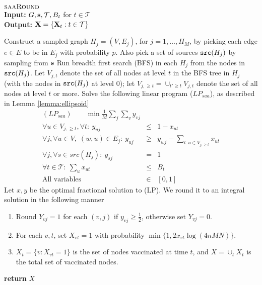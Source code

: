 \begin{algorithm}{}
\small
\caption{\small $\textsc{saaRound}{}$\\
\textbf{Input:} $G, \mathbf{s}, \mathcal{T}, B_t$ for $t\in\mathcal{T}$\\
\textbf{Output:} $\mathbf{X}=\{\mathbf{X}_t: t\in\mathcal{T}\}$
}
\label{alg:saaround}
\begin{algorithmic}[1]
\STATE
Construct a sampled graph $H_j=(V, E_j)$, for $j=1,\ldots,H_M$, by picking each edge $e\in E$ to be in $E_j$
with probability $p$. Also pick a set of sources $\texttt{src}(H_j)$ by sampling from $\mathbf{s}$
\STATE
Run breadth first search (BFS) in each $H_j$ from the nodes in $\texttt{src}(H_j)$.
Let $V_{j,t}$ denote the set of all nodes at level $t$ in the BFS tree in $H_j$ 
(with the nodes in $\texttt{src}(H_j)$ at level $0$); let $V_{j,\geq t}=\cup_{t'\geq t} V_{j,t}$ denote
the set of all nodes at level $t$ or more.
\STATE
Solve the following linear program ($LP_{saa}$), as described in Lemma \ref{lemma:ellipsoid}
\begin{eqnarray}
\label{eqn:obj}
(LP_{saa}) \qquad  \min \frac{1}{M}\sum_j \sum_v y_{vj} && \\
\label{eqn:xy}
\forall u \in V_{j, \geq t}, \forall t:\ y_{uj} &\leq& 1 - x_{ut} \\
\label{eqn1}
\forall j, \forall u\in V, \; (w, u)\in E_j:\ y_{uj} &\geq& y_{wj} - \sum_{t: u \in V_{j, \geq t}} x_{ut}\\
\label{eqn:src}
\forall j, \forall s \in src(H_j):\ y_{sj} &=& 1\\
\label{eqn:budget}
\forall t\in\mathcal{T}:\ \sum_u x_{ut} &\leq& B_t\\
\mbox{All variables} &\in& [0, 1]
\end{eqnarray}
\STATE
Let $x, y$ be the optimal fractional solution to (LP).
We round it to an integral solution in the following manner
\begin{enumerate}
\item
Round $Y_{vj} = 1$ for each $(v,j)$ if $y_{vj} \geq \frac{1}{2}$, otherwise set $Y_{vj} = 0$.
\item
For each $v, t$, set $X_{vt}=1$ with probability $\min\{1, 2 x_{vt}\log(4nMN)\}$. 
\item
$X_t=\{v: X_{vt}=1\}$ is the set of nodes vaccinated at time $t$, and $X=\cup_t X_t$
is the total set of vaccinated nodes.
\end{enumerate}
\STATE \textbf{return} $X$
\end{algorithmic}
\end{algorithm}


